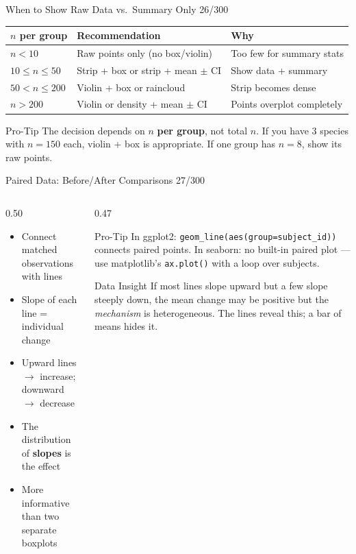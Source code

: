 \documentclass[10pt]{beamer}
\newcommand{\smark}[1]{\hfill{\scriptsize\color{codegray}#1}}
\begin{document}
\begin{frame}{When to Show Raw Data vs.\ Summary Only}
\smark{26/300}
\centering\small
\begin{tabular}{@{}lll@{}}
    \toprule
    \textbf{$n$ per group} & \textbf{Recommendation} & \textbf{Why} \\
    \midrule
    $n < 10$    & Raw points only (no box/violin)          & Too few for summary stats \\
    $10 \leq n \leq 50$  & Strip + box or strip + mean $\pm$ CI & Show data + summary \\
    $50 < n \leq 200$ & Violin + box or raincloud          & Strip becomes dense \\
    $n > 200$   & Violin or density + mean $\pm$ CI        & Points overplot completely \\
    \bottomrule
\end{tabular}

\vspace{0.3cm}
\begin{alertblock}{Pro-Tip}
    \scriptsize The decision depends on $n$ \textbf{per group}, not total $n$. If you have 3 species with $n=150$ each, violin + box is appropriate. If one group has $n=8$, show its raw points.
\end{alertblock}
\end{frame}

\begin{frame}{Paired Data: Before/After Comparisons}
\smark{27/300}
\begin{columns}[T]
\begin{column}{0.50\textwidth}
\begin{itemize}
    \item Connect matched observations with lines
    \item Slope of each line = individual change
    \item Upward lines $\to$ increase; downward $\to$ decrease
    \item The distribution of \textbf{slopes} is the effect
    \item More informative than two separate boxplots
\end{itemize}
\end{column}
\begin{column}{0.47\textwidth}
\begin{alertblock}{Pro-Tip}
    \scriptsize In ggplot2: \texttt{geom\_line(aes(group=subject\_id))} connects paired points. In seaborn: no built-in paired plot --- use matplotlib's \texttt{ax.plot()} with a loop over subjects.
\end{alertblock}
\vspace{0.2cm}
\begin{exampleblock}{Data Insight}
    \scriptsize If most lines slope upward but a few slope steeply down, the mean change may be positive but the \emph{mechanism} is heterogeneous. The lines reveal this; a bar of means hides it.
\end{exampleblock}
\end{column}
\end{columns}
\end{frame}
\end{document}
